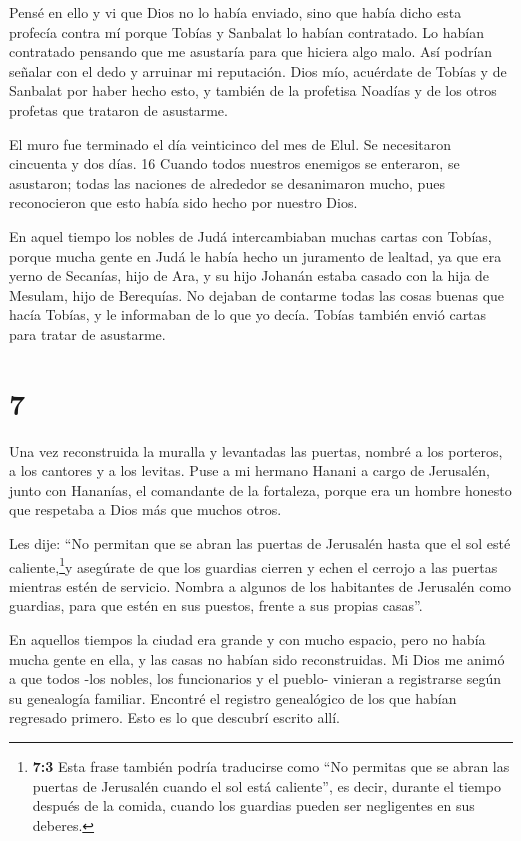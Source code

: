  Pensé en ello y vi que Dios no lo había enviado, sino que
había dicho esta profecía contra mí porque Tobías y Sanbalat lo habían
contratado.  Lo habían contratado pensando que me asustaría
para que hiciera algo malo. Así podrían señalar con el dedo y arruinar
mi reputación.  Dios mío, acuérdate de Tobías y de Sanbalat
por haber hecho esto, y también de la profetisa Noadías y de los otros
profetas que trataron de asustarme.

 El muro fue terminado el día veinticinco del mes de Elul.
Se necesitaron cincuenta y dos días. 16 Cuando todos nuestros enemigos
se enteraron, se asustaron; todas las naciones de alrededor se
desanimaron mucho, pues reconocieron que esto había sido hecho por
nuestro Dios.

 En aquel tiempo los nobles de Judá intercambiaban muchas
cartas con Tobías,  porque mucha gente en Judá le había
hecho un juramento de lealtad, ya que era yerno de Secanías, hijo de
Ara, y su hijo Johanán estaba casado con la hija de Mesulam, hijo de
Berequías.  No dejaban de contarme todas las cosas buenas
que hacía Tobías, y le informaban de lo que yo decía. Tobías también
envió cartas para tratar de asustarme.

\hypertarget{section-6}{%
\section{7}\label{section-6}}

 Una vez reconstruida la muralla y levantadas las puertas,
nombré a los porteros, a los cantores y a los levitas.  Puse
a mi hermano Hanani a cargo de Jerusalén, junto con Hananías, el
comandante de la fortaleza, porque era un hombre honesto que respetaba a
Dios más que muchos otros.

 Les dije: ``No permitan que se abran las puertas de
Jerusalén hasta que el sol esté caliente,\footnote{\textbf{7:3} Esta
  frase también podría traducirse como ``No permitas que se abran las
  puertas de Jerusalén cuando el sol está caliente'', es decir, durante
  el tiempo después de la comida, cuando los guardias pueden ser
  negligentes en sus deberes.}y asegúrate de que los guardias cierren y
echen el cerrojo a las puertas mientras estén de servicio. Nombra a
algunos de los habitantes de Jerusalén como guardias, para que estén en
sus puestos, frente a sus propias casas''.

 En aquellos tiempos la ciudad era grande y con mucho
espacio, pero no había mucha gente en ella, y las casas no habían sido
reconstruidas.  Mi Dios me animó a que todos -los nobles,
los funcionarios y el pueblo- vinieran a registrarse según su genealogía
familiar. Encontré el registro genealógico de los que habían regresado
primero. Esto es lo que descubrí escrito allí.

